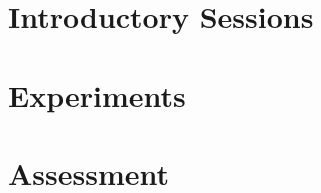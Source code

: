 \documentclass[a4paper,10pt]{article}
\begin{document}
\part{Introductory Sessions}



\clearpage

\part{Experiments}





\clearpage
{} 



\clearpage
{} 
 


\clearpage
{} 



\clearpage
{} 



\part{Assessment}



\clearpage
{} 
\end{document}
